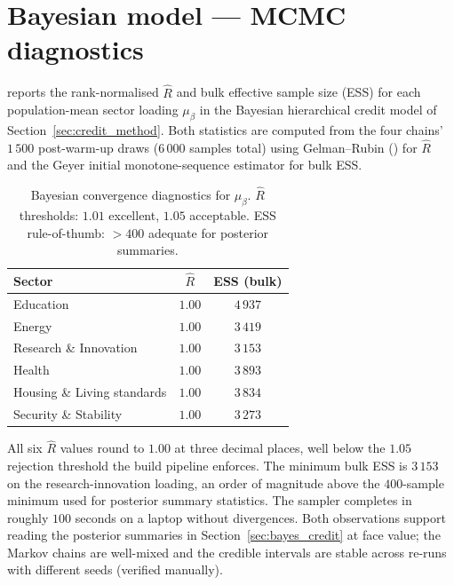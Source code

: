 \section{Bayesian model — MCMC diagnostics}\label{app:mcmc}

 reports the rank-normalised $\widehat{R}$ \parencite{vehtari2021rank} and bulk effective sample size (ESS) for each population-mean sector loading $\mu_\beta$ in the Bayesian hierarchical credit model of Section~\ref{sec:credit_method}. Both statistics are computed from the four chains' $1\,500$ post-warm-up draws ($6\,000$ samples total) using Gelman--Rubin (\textcite{gelmanetal2013}) for $\widehat{R}$ and the Geyer initial monotone-sequence estimator for bulk ESS.

\begin{table}[h]
  \centering\small
  \begin{threeparttable}
  \caption{Bayesian convergence diagnostics for $\mu_\beta$. $\widehat{R}$ thresholds: $1.01$ excellent, $1.05$ acceptable. ESS rule-of-thumb: $> 400$ adequate for posterior summaries.}
  \label{tab:mcmc_diagnostics}
  \begin{tabular}{lcc}
    \toprule
    Sector & $\widehat{R}$ & ESS (bulk) \\
    \midrule
    Education & $1.00$ & $4\,937$ \\
    Energy & $1.00$ & $3\,419$ \\
    Research \& Innovation & $1.00$ & $3\,153$ \\
    Health & $1.00$ & $3\,893$ \\
    Housing \& Living standards & $1.00$ & $3\,834$ \\
    Security \& Stability & $1.00$ & $3\,273$ \\
    \bottomrule
  \end{tabular}
  \end{threeparttable}
\end{table}

All six $\widehat{R}$ values round to $1.00$ at three decimal places, well below the $1.05$ rejection threshold the build pipeline enforces. The minimum bulk ESS is $3\,153$ on the research-innovation loading, an order of magnitude above the $400$-sample minimum used for posterior summary statistics. The sampler completes in roughly $100$ seconds on a laptop without divergences. Both observations support reading the posterior summaries in Section~\ref{sec:bayes_credit} at face value; the Markov chains are well-mixed and the credible intervals are stable across re-runs with different seeds (verified manually).
